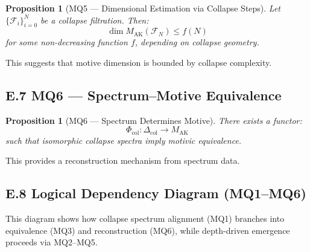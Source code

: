 \documentclass[11pt]{article}
\newtheorem{proposition}[theorem]{Proposition}
\begin{document}
\begin{proposition}[MQ5 — Dimensional Estimation via Collapse Steps]
Let $\{ \mathcal{F}_i \}_{i=0}^N$ be a collapse filtration. Then:
\[
\dim M_{\mathrm{AK}}(\mathcal{F}_N) \leq f(N)
\]
for some non-decreasing function $f$, depending on collapse geometry.
\end{proposition}

This suggests that motive dimension is bounded by collapse complexity.

\subsection*{E.7 MQ6 — Spectrum–Motive Equivalence}

\begin{proposition}[MQ6 — Spectrum Determines Motive]
There exists a functor:
\[
\Phi_{\mathrm{col}} : \Delta_{\mathrm{col}} \longrightarrow M_{\mathrm{AK}}
\]
such that isomorphic collapse spectra imply motivic equivalence.
\end{proposition}

This provides a reconstruction mechanism from spectrum data.

\subsection*{E.8 Logical Dependency Diagram (MQ1–MQ6)}

\vspace{1em}
\begin{center}
\end{center}
\vspace{1em}

This diagram shows how collapse spectrum alignment (MQ1) branches into equivalence (MQ3) and reconstruction (MQ6), while depth-driven emergence proceeds via MQ2–MQ5.

\FloatBarrier


\end{document}
